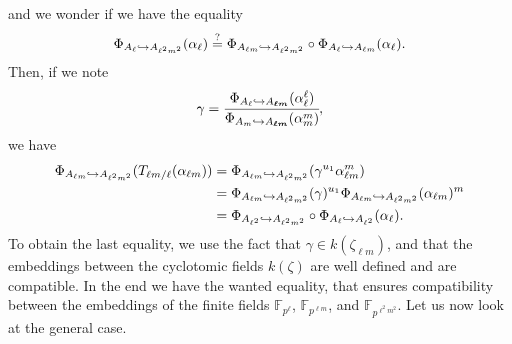 \documentclass[a4paper,11pt]{article}
\begin{document}
and we wonder if we have the equality
\[
  \Phi_{A_{\ell}\hookrightarrow A_{\ell^2m^2}}(\alpha_\ell)\overset{?}{=}\Phi_{A_{\ell
  m}\hookrightarrow A_{\ell^2m^2}}\circ\Phi_{A_{\ell}\hookrightarrow A_{\ell m}}(\alpha_\ell).
\]
Then, if we note
\[
  \gamma = \cfrac{\Phi_{A_{\ell}\hookrightarrow A_{\bm{\ell
  m}}}(\alpha_{\ell}^{\ell})}{\Phi_{A_{m}\hookrightarrow A_{\bm{\ell
  m}}}(\alpha_{m}^{m})},
\]
we have
\begin{align*}
  \Phi_{A_{\ell m }\hookrightarrow A_{\ell^2m^2}}(T_{\ell m/\ell}(\alpha_{\ell m})) &=
  \Phi_{A_{\ell m}\hookrightarrow A_{\ell^2m^2}}(\gamma^{u_1}\alpha_{\ell m}^m)\\
  &= \Phi_{A_{\ell m}\hookrightarrow A_{\ell^2 m^2}}(\gamma)^{u_1}\Phi_{A_{\ell m}\hookrightarrow
  A_{\ell^2 m^2}}(\alpha_{\ell m})^{m}\\
  &= \Phi_{A_{\ell^2}\hookrightarrow A_{\ell^2m^2}}\circ\Phi_{A_{\ell}\hookrightarrow
  A_{\ell^2}}(\alpha_\ell).
\end{align*}
To obtain the last equality, we use the fact that $\gamma\in k(\zeta_{\ell m})$,
and that the embeddings between the cyclotomic fields $k(\zeta)$ are well
defined and are compatible. In the end we have the wanted equality, that ensures
compatibility between the embeddings of the finite fields $\mathbb{F}_{p^\ell}$,
$\mathbb{F}_{p^{\ell m}}$, and $\mathbb{F}_{p^{\ell^2m^2}}$. Let us now look at
the general case.
\end{document}
